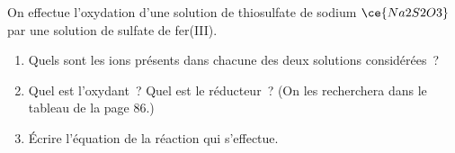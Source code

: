 On effectue l'oxydation d'une solution de thiosulfate de sodium $\ce{Na2S2O3}$
par une solution de sulfate de fer(III).
\begin{enumerate}
    \item Quels sont les ions présents dans chacune des deux solutions
          considérées~?
    \item Quel est l'oxydant~? Quel est le réducteur~? (On les recherchera dans
          le tableau de la page 86.)
    \item Écrire l'équation de la réaction qui s'effectue.
\end{enumerate}

